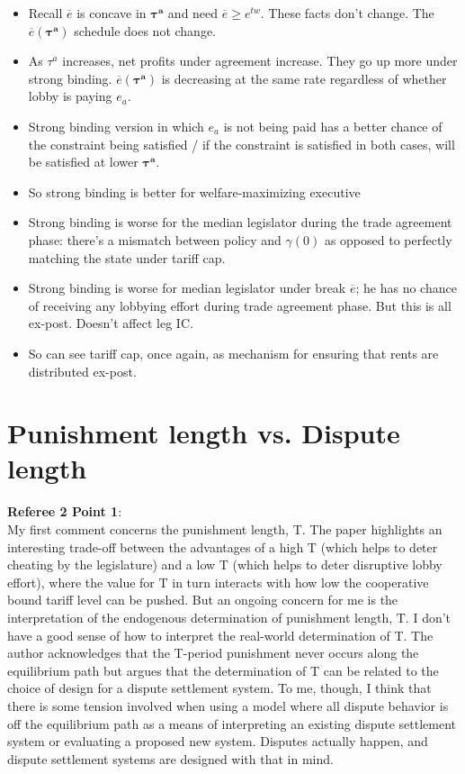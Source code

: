 \documentclass[12pt]{article}
\newcommand{\ov}{\overline}
\newcommand{\bta}{\bm{\tau^a}}
\newcommand{\ga}{\gamma}
\begin{document}
\begin{itemize}
\begin{itemize}
			\item Recall $\ov{e}$ is concave in $\bta$ and need $\ov{e} \geq e^{tw}$. These facts don't change. The $\ov{e}(\bta)$ schedule does not change. 
			\item As $\tau^a$ increases, net profits under agreement increase. They go up more under strong binding. $\ov{e}(\bta)$ is decreasing at the same rate regardless of whether lobby is paying $e_a$.
			\item Strong binding version in which $e_a$ is not being paid has a better chance of the constraint being satisfied / if the constraint is satisfied in both cases, will be satisfied at lower $\bta$.
			\item So strong binding is better for welfare-maximizing executive
			\item Strong binding is worse for the median legislator during the trade agreement phase: there's a mismatch between policy and $\ga(0)$ as opposed to perfectly matching the state under tariff cap.
			\item Strong binding is worse for median legislator under break $\ov{e}$; he has no chance of receiving any lobbying effort during trade agreement phase. But this is all ex-post. Doesn't affect leg IC.
			\item So can see tariff cap, once again, as mechanism for ensuring that rents are distributed ex-post.
		\end{itemize}
\end{itemize}



\newpage
\section{Punishment length vs. Dispute length}
\textbf{Referee 2 Point 1}: \\
My first comment concerns the punishment length, T. The paper highlights an interesting trade-off between the advantages of a high T (which helps to deter cheating by the legislature) and a low T (which helps to deter disruptive lobby effort), where the value for T in turn interacts with how low the cooperative bound tariff level can be pushed. But an ongoing concern for me is the interpretation of the endogenous determination of punishment length, T. I don't have a good sense of how to interpret the real-world determination of T. The author acknowledges that the T-period punishment never occurs along the equilibrium path but argues that the determination of T can be related to the choice of design for a dispute settlement system. To me, though, I think that there is some tension involved when using a model where all dispute behavior is off the equilibrium path as a means of interpreting an existing dispute settlement system or evaluating a proposed new system. Disputes actually happen, and dispute settlement systems are designed with that in mind. \\
\end{document}

